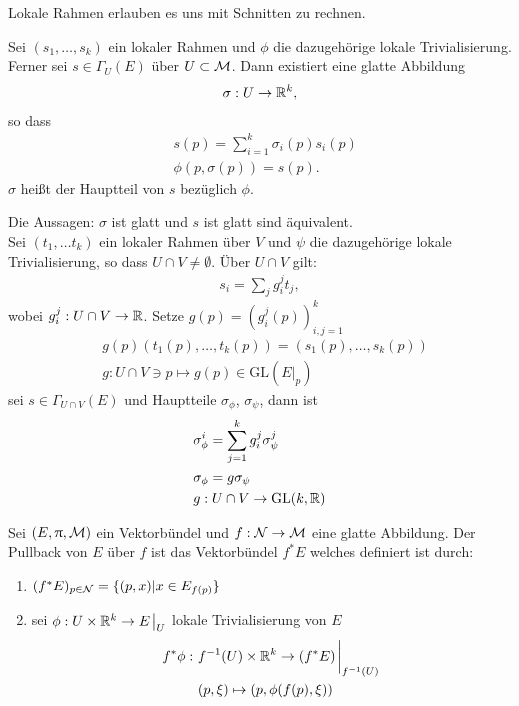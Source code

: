 Lokale Rahmen erlauben es uns mit Schnitten zu rechnen.

\begin{defs}[Hauptteil]
Sei $(s_1, \dots, s_k)$ ein lokaler Rahmen und $\phi$ die dazugehörige lokale Trivialisierung.
Ferner sei $s \in \Gamma_U (E)$ über $U \subset \mathcal{M}$.
Dann existiert eine glatte Abbildung
\begin{align*}
\sigma : U \to \mathbb{R}^k,
\end{align*}
so dass
\begin{align}
&s(p) = \sum^{k}_{i=1} \sigma_i (p) s_i(p)\\
&\phi(p, \sigma(p)) = s(p).
\end{align}
$\sigma$ heißt der Hauptteil von $s$ bezüglich $\phi$.
\end{defs}

\begin{bem}
Die Aussagen: $\sigma$ ist glatt und $s$ ist glatt sind äquivalent.\\

Sei $(t_1, \dots t_k)$ ein lokaler Rahmen über $V$ und $\psi$ die dazugehörige lokale Trivialisierung, so dass $U \cap V \neq \emptyset$.
Über $U \cap V$ gilt:
\begin{align}
s_i = \sum_j g^j_i t_j,
\end{align}
wobei $g^j_i : U \cap V \to \mathbb{R}$.
Setze $g(p) = (g^j_i (p))^k_{i,j =1}$
\begin{align}
& g(p)(t_1(p), \dots , t_k(p)) = (s_1(p), \dots, s_k(p))\\
& g: U \cap V \ni p \mapsto g(p) \in \mathrm{GL}(E\big\vert_p)
\end{align}
sei $s \in \Gamma_{U \cap V} (E)$ und Hauptteile $\sigma_\phi$, $\sigma_\psi$, dann ist
\begin{align*}
&\sigma^i_\phi = \sum^k_{j=1} g^j_i \sigma^j_{\psi}\\
&\sigma_\phi = g \sigma_\psi\\
&g : U \cap V \to \mathrm{GL} (k, \mathbb{R})
\end{align*}
\end{bem}

\begin{defs}[Pullback]
Sei $(E, \uppi, \mathcal{M})$ ein Vektorbündel und $f : \mathcal{N} \to \mathcal{M}$ eine glatte Abbildung.
Der Pullback von $E$ über $f$ ist das Vektorbündel $f^* E$ welches definiert ist durch:
\begin{enumerate}
\item $(f^* E)_{p \in \mathcal{N}} = \{ (p, x) \vert x \in E_{f(p)}\}$
\item sei $\phi : U \times \R^k \to E\eval_U$ lokale Trivialisierung von $E$
\begin{align}
f^* \phi : \ & f^{-1} (U) \times \R^k \to (f^* E)\eval_{f^{-1}(U)}\\
&(p, \xi) \mapsto (p, \phi(f(p), \xi)) 
\end{align}
\end{enumerate}
\end{defs}


